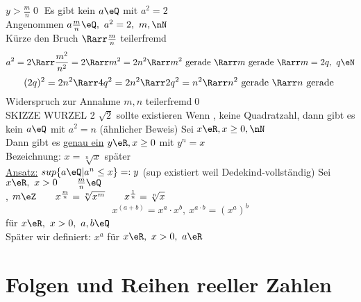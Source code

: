 $y>\frac{m}{n}$\qed
%
\Satz
Es gibt kein $a\eQ$ mit $a^2=2$\\
\bew
Angenommen $a\frac{m}{n}\eQ,\ a^2=2,\ m,\nN$\\
Kürze den Bruch $\Rarr \frac{m}{n}$ teilerfremd\\
$$a^2=2\Rarr \frac{m^2}{n^2}=2 \Rarr m^2=2n^2 \Rarr m^2 \text{ gerade } \Rarr m \text{ gerade } \Rarr m=2q,\ q\eN$$
$$(2q)^2=2n^2 \Rarr 4q^2=2n^2 \Rarr 2q^2=n^2 \Rarr  n^2 \text{ gerade } \Rarr n \text{ gerade }$$
Widerspruch zur Annahme $m,n$ teilerfremd\qed\\
SKIZZE WURZEL 2 \Rarr $\sqrt{2}$ sollte existieren %
\bem
Wenn \nN, keine Quadratzahl, dann gibt es kein $a\eQ$ mit $a^2=n$ (ähnlicher Beweis)
%
\Satz
Sei $x\eR, x\geq 0, \nN$\\
Dann gibt es \underline{genau ein} $y\eR, x\geq 0$ mit $y^n=x$\\
Bezeichnung: $x=\sqrt[n]{x}$
\bew
später\\
\underline{Ansatz:} $sup\{a\eQ|a^n\leq x\}=:y$ (sup existiert weil \R{} Dedekind-vollständig)
%
\Def
Sei $x\eR,\ x>0\qquad \frac{m}{n}\eQ$\\
\nN, $m\eZ\qquad x^{\frac{m}{n}}=\sqrt[n]{x^m}\qquad x^{\frac{1}{n}}=\sqrt[n]{x}$\\
 $$x^{(a+b)}=x^a·x^b,\ x^{a·b}=(x^a)^b$$\hfill für $x\eR,\ x>0,\ a,b\eQ$\\
\bem
Später wir definiert: $x^a$ für $x\eR,\ x>0,\ a\eR$
\chapter{Folgen und Reihen reeller Zahlen}

